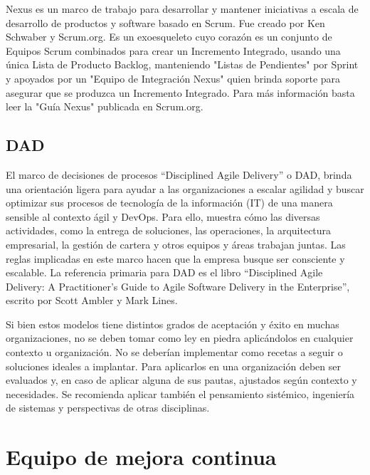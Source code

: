 Nexus es un marco de trabajo para desarrollar y mantener iniciativas a escala de desarrollo de productos y software basado en Scrum. Fue creado por Ken Schwaber y Scrum.org. Es un exoesqueleto cuyo corazón es un conjunto de Equipos Scrum combinados para crear un Incremento Integrado, usando una única Lista de Producto Backlog, manteniendo "Listas de Pendientes" por Sprint y apoyados por un "Equipo de Integración Nexus" quien brinda soporte para asegurar que se produzca un Incremento Integrado. Para más información basta leer la "Guía Nexus" publicada en Scrum.org.

\subsection{DAD}

El marco de decisiones de procesos “Disciplined Agile Delivery” o DAD, brinda una orientación ligera para ayudar a las organizaciones a escalar agilidad y buscar optimizar sus procesos de tecnología de la información (IT) de una manera sensible al contexto ágil y DevOps. Para ello, muestra cómo las diversas actividades, como la entrega de soluciones, las operaciones, la arquitectura empresarial, la gestión de cartera y otros equipos y áreas trabajan juntas. Las reglas implicadas en este marco hacen que la empresa busque ser consciente y escalable. La referencia primaria para DAD es el libro “Disciplined Agile Delivery: A Practitioner's Guide to Agile Software Delivery in the Enterprise”,  escrito por Scott Ambler y Mark Lines.\newline
\newline

Si bien estos modelos tiene distintos grados de aceptación y éxito en muchas organizaciones, no se deben tomar como ley en piedra aplicándolos en cualquier contexto u organización. No se deberían implementar como recetas a seguir o soluciones ideales a implantar. Para aplicarlos en una organización deben ser evaluados y, en caso de aplicar alguna de sus pautas, ajustados según contexto y necesidades. Se recomienda aplicar también el pensamiento sistémico, ingeniería de sistemas y perspectivas de otras disciplinas.

\section{Equipo de mejora continua}

